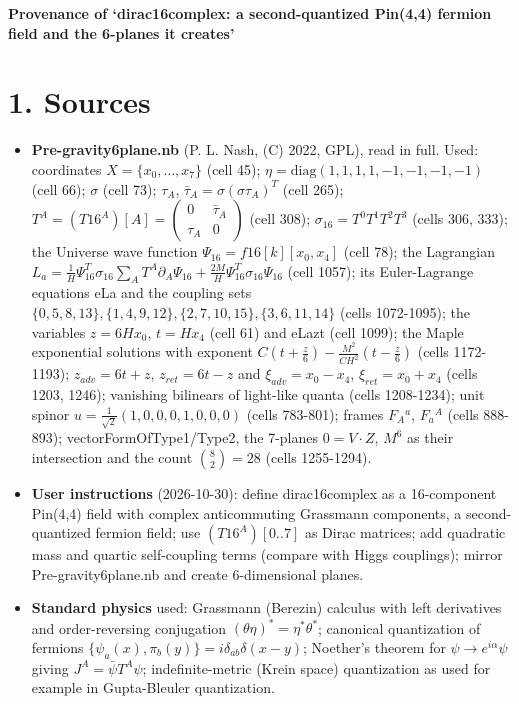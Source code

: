 \documentclass[10pt]{article}
\begin{document}
{\raggedright\LARGE\bfseries Provenance of `dirac16complex: a second-quantized Pin(4,4) fermion field and the 6-planes it creates'\par}\medskip

\section*{1. Sources}

\begin{itemize}
\item \textbf{Pre-gravity6plane.nb} (P. L. Nash, (C) 2022, GPL), read in full. Used: coordinates $X=\{x_0,\dots,x_7\}$ (cell 45); $\eta=\mathrm{diag}(1,1,1,1,-1,-1,-1,-1)$ (cell 66); $\sigma$ (cell 73); $\tau_A$, $\bar\tau_A = \sigma(\sigma\tau_A)^T$ (cell 265); $T^A=(T16^A)[A] = \begin{pmatrix}0&\bar\tau_A\\ \tau_A&0\end{pmatrix}$ (cell 308); $\sigma_{16}=T^0T^1T^2T^3$ (cells 306, 333); the Universe wave function $\Psi_{16} = f16[k][x_0,x_4]$ (cell 78); the Lagrangian $L_a = \frac1H\Psi_{16}^T\sigma_{16}\sum_AT^A\partial_A\Psi_{16} + \frac{2M}H\Psi_{16}^T\sigma_{16}\Psi_{16}$ (cell 1057); its Euler-Lagrange equations eLa and the coupling sets $\{0,5,8,13\},\{1,4,9,12\},\{2,7,10,15\},\{3,6,11,14\}$ (cells 1072-1095); the variables $z = 6Hx_0$, $t = Hx_4$ (cell 61) and eLazt (cell 1099); the Maple exponential solutions with exponent $C(t+\frac z6) - \frac{M^2}{CH^2}(t-\frac z6)$ (cells 1172-1193); $z_{adv} = 6t+z$, $z_{ret}=6t-z$ and $\xi_{adv}=x_0-x_4$, $\xi_{ret}=x_0+x_4$ (cells 1203, 1246); vanishing bilinears of light-like quanta (cells 1208-1234); unit spinor $u = \frac1{\sqrt2}(1,0,0,0,1,0,0,0)$ (cells 783-801); frames $F_A{}^a$, $F_a{}^A$ (cells 888-893); vectorFormOfType1/Type2, the 7-planes $0 = V\cdot Z$, $M^6$ as their intersection and the count $\binom82 = 28$ (cells 1255-1294).
\item \textbf{User instructions} (2026-10-30): define dirac16complex as a 16-component Pin(4,4) field with complex anticommuting Grassmann components, a second-quantized fermion field; use $(T16^A)[0..7]$ as Dirac matrices; add quadratic mass and quartic self-coupling terms (compare with Higgs couplings); mirror Pre-gravity6plane.nb and create 6-dimensional planes.
\item \textbf{Standard physics} used: Grassmann (Berezin) calculus with left derivatives and order-reversing conjugation $(\theta\eta)^* = \eta^*\theta^*$; canonical quantization of fermions $\{\psi_a(x),\pi_b(y)\} = i\delta_{ab}\delta(x-y)$; Noether's theorem for $\psi\to e^{i\alpha}\psi$ giving $J^A = \bar\psi T^A\psi$; indefinite-metric (Krein space) quantization as used for example in Gupta-Bleuler quantization.
\end{itemize}
\end{document}
